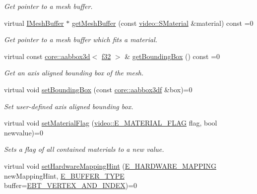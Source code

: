 \begin{DoxyCompactItemize}
\begin{DoxyCompactList}\small\item\em Get pointer to a mesh buffer. \end{DoxyCompactList}\item 
virtual \hyperlink{classirr_1_1scene_1_1IMeshBuffer}{I\+Mesh\+Buffer} $\ast$ \hyperlink{classirr_1_1scene_1_1IMesh_a9573dace82efb01ba1f35f9cc28a4ced}{get\+Mesh\+Buffer} (const \hyperlink{classirr_1_1video_1_1SMaterial}{video\+::\+S\+Material} \&material) const =0
\begin{DoxyCompactList}\small\item\em Get pointer to a mesh buffer which fits a material. \end{DoxyCompactList}\item 
virtual const \hyperlink{classirr_1_1core_1_1aabbox3d}{core\+::aabbox3d}$<$ \hyperlink{namespaceirr_a0277be98d67dc26ff93b1a6a1d086b07}{f32} $>$ \& \hyperlink{classirr_1_1scene_1_1IMesh_ada6ecee9cbebed8bb67fd92872552ea0}{get\+Bounding\+Box} () const =0
\begin{DoxyCompactList}\small\item\em Get an axis aligned bounding box of the mesh. \end{DoxyCompactList}\item 
virtual void \hyperlink{classirr_1_1scene_1_1IMesh_a0aee3b5bc5d31ce996becc069f65e642}{set\+Bounding\+Box} (const \hyperlink{namespaceirr_1_1core_a60f4b4c744aba55f10530d503c6ecb04}{core\+::aabbox3df} \&box)=0
\begin{DoxyCompactList}\small\item\em Set user-\/defined axis aligned bounding box. \end{DoxyCompactList}\item 
virtual void \hyperlink{classirr_1_1scene_1_1IMesh_a56e034b671f52653d6c91e0ffa42febd}{set\+Material\+Flag} (\hyperlink{namespaceirr_1_1video_a8a3bc00ae8137535b9fbc5f40add70d3}{video\+::\+E\+\_\+\+M\+A\+T\+E\+R\+I\+A\+L\+\_\+\+F\+L\+AG} flag, bool newvalue)=0
\begin{DoxyCompactList}\small\item\em Sets a flag of all contained materials to a new value. \end{DoxyCompactList}\item 
virtual void \hyperlink{classirr_1_1scene_1_1IMesh_a1de908b8e67c28bdac546e8599043dfe}{set\+Hardware\+Mapping\+Hint} (\hyperlink{namespaceirr_1_1scene_ac7d8ee8d77da75f2580bb9bb17231c27}{E\+\_\+\+H\+A\+R\+D\+W\+A\+R\+E\+\_\+\+M\+A\+P\+P\+I\+NG} new\+Mapping\+Hint, \hyperlink{namespaceirr_1_1scene_a8f59a89ffef0ad8e5b2c2cb874a93e8c}{E\+\_\+\+B\+U\+F\+F\+E\+R\+\_\+\+T\+Y\+PE} buffer=\hyperlink{namespaceirr_1_1scene_a8f59a89ffef0ad8e5b2c2cb874a93e8ca34ea664123fbc28610408e51b014dcdd}{E\+B\+T\+\_\+\+V\+E\+R\+T\+E\+X\+\_\+\+A\+N\+D\+\_\+\+I\+N\+D\+EX})=0

\end{DoxyCompactItemize}
